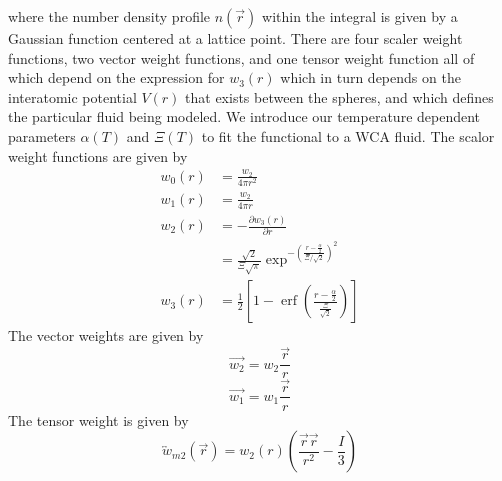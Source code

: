\documentclass[double,12pt]{beavtex}
\begin{document}
where the number density profile $n(\vec r)$ within the integral is given 
by a Gaussian function centered at a lattice point.
%
There are four scaler weight functions, two vector weight functions, and 
one tensor weight function all of which 
depend on the expression for $w_3(r)$ 
which in turn depends on the interatomic potential $V(r)$ that exists 
between the spheres, and which defines the particular fluid being modeled.
We introduce our temperature dependent parameters $\alpha(T)$ and $\Xi(T)$ 
to fit the functional to a WCA fluid.
The scalor weight functions are given by
\begin{align}\label{eq:weights}
  w_{0}(r) &=\frac{w_{2}}{4\pi{r}^2} \\
  w_{1}(r) &=\frac{w_{2}}{4\pi{r}} \\
  w_2(r) &=-\frac{\partial{w_3(r)}}{\partial{r}} \\
  &= \frac{\sqrt{2}}{\Xi\sqrt\pi}\exp^{-\left(\frac{r-\frac{\alpha}{2}}{\Xi/\sqrt{2}}\right)^2}  \\
  w_3(r) &=\frac{1}{2}\left[1-\operatorname{erf}\left(\frac{r-\frac{\alpha}{2}}{\frac{\Xi}{\sqrt{2}}}\right)\right]  
\end{align}
%
The vector weights are given by 
\begin{equation}\label{eq:w_v2}{  \vec{w_{2}}=w_{2}\frac{\vec{r}}{r}  }\end{equation}
\begin{equation}\label{eq:w_v1}{  \vec{w_{1}}=w_{1}\frac{\vec{r}}{r}  }\end{equation} 
The tensor weight is given by
\begin{equation}\label{eq:tensorweight-methods}\overleftrightarrow{w}_{m2}(\vec{r}) = w_2(r)\left(\frac{\vec{r}\vec{r}}{r^2}-\frac{I}{3}\right)\end{equation}
\end{document}
